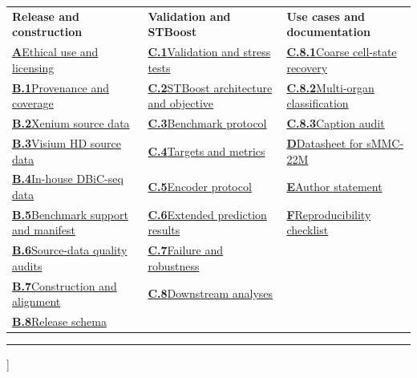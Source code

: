 \documentclass[sigconf,review]{acmart}
\newcommand{\dataset}{sMMC-22M\xspace}
\newcommand{\methodname}{STBoost\xspace}
\begin{document}
{\begin{minipage}{\textwidth}
\begingroup
\footnotesize
\setlength{\tabcolsep}{0pt}
\renewcommand{\arraystretch}{1.16}
\begin{tabularx}{\textwidth}{@{}>{\raggedright\arraybackslash}X@{\hspace{1.35em}}>{\raggedright\arraybackslash}X@{\hspace{1.35em}}>{\raggedright\arraybackslash}X@{}}
\textbf{Release and construction} &
\textbf{Validation and \methodname} &
\textbf{Use cases and documentation} \\
\hyperref[sec:ethics]{\textbf{A}\enspace Ethical use and licensing} &
\hyperref[sec:reviewer_validation]{\textbf{C.1}\enspace Validation and stress tests} &
\hyperref[sec:coarse_cell_state]{\textbf{C.8.1}\enspace Coarse cell-state recovery} \\
\hyperref[sec:provenance_coverage]{\textbf{B.1}\enspace Provenance and coverage} &
\hyperref[sec:STBoost_appendix_details]{\textbf{C.2}\enspace \methodname architecture and objective} &
\hyperref[sec:multi_organ_classification]{\textbf{C.8.2}\enspace Multi-organ classification} \\
\hyperref[sec:comp_path]{\textbf{B.2}\enspace Xenium source data} &
\hyperref[sec:benchmark_protocol]{\textbf{C.3}\enspace Benchmark protocol} &
\hyperref[sec:caption_audit]{\textbf{C.8.3}\enspace Caption audit} \\
\hyperref[sec:st]{\textbf{B.3}\enspace Visium HD source data} &
\hyperref[sec:prediction_metrics]{\textbf{C.4}\enspace Targets and metrics} &
\hyperref[sec:cellnet_datasheet]{\textbf{D}\enspace Datasheet for \dataset} \\
\hyperref[sec:inhouse_dbic]{\textbf{B.4}\enspace In-house DBiC-seq data} &
\hyperref[sec:encoder_protocol]{\textbf{C.5}\enspace Encoder protocol} &
\hyperref[sec:author_statement]{\textbf{E}\enspace Author statement} \\
\hyperref[sec:benchmark_manifest]{\textbf{B.5}\enspace Benchmark support and manifest} &
\hyperref[sec:extended_prediction_results]{\textbf{C.6}\enspace Extended prediction results} &
\hyperref[sec:reproducibility_checklist]{\textbf{F}\enspace Reproducibility checklist} \\
\hyperref[sec:source_quality_audits]{\textbf{B.6}\enspace Source-data quality audits} &
\hyperref[sec:failure_robustness]{\textbf{C.7}\enspace Failure and robustness} &
\\
\hyperref[sec:construction_alignment]{\textbf{B.7}\enspace Construction and alignment} &
\hyperref[sec:downstream_use_cases]{\textbf{C.8}\enspace Downstream analyses} &
\\
\hyperref[sec:release_schema]{\textbf{B.8}\enspace Release schema} &&
\\
\end{tabularx}
\endgroup
\vspace{6pt}
\hrule
\vspace{9pt}
\end{minipage}
}]
\thispagestyle{plain}
\end{document}
